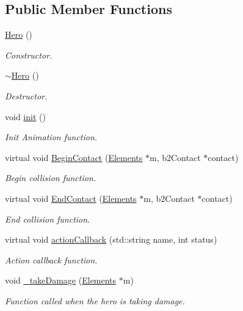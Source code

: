 \subsection*{Public Member Functions}
\begin{DoxyCompactItemize}
\item 
\hyperlink{class_hero_ab5920677a4b5cb59d6f513922d037dca}{Hero} ()
\begin{DoxyCompactList}\small\item\em Constructor. \end{DoxyCompactList}\item 
\hyperlink{class_hero_a5aeef41ede5a80dc29c5acd7b553c4da}{$\sim$\+Hero} ()
\begin{DoxyCompactList}\small\item\em Destructor. \end{DoxyCompactList}\item 
void \hyperlink{class_hero_ae67cc4b7770083755895b78664d0ea34}{init} ()
\begin{DoxyCompactList}\small\item\em Init Animation function. \end{DoxyCompactList}\item 
virtual void \hyperlink{class_hero_ac23c090d8f5e2768b4175580a0d53d1b}{Begin\+Contact} (\hyperlink{class_elements}{Elements} $\ast$m, b2\+Contact $\ast$contact)
\begin{DoxyCompactList}\small\item\em Begin collision function. \end{DoxyCompactList}\item 
virtual void \hyperlink{class_hero_a9fee92d1b0df478f95bc10ba84015d2a}{End\+Contact} (\hyperlink{class_elements}{Elements} $\ast$m, b2\+Contact $\ast$contact)
\begin{DoxyCompactList}\small\item\em End collision function. \end{DoxyCompactList}\item 
virtual void \hyperlink{class_hero_aa41ef53abd25057ceb431811ccf80ad5}{action\+Callback} (std\+::string name, int status)
\begin{DoxyCompactList}\small\item\em Action callback function. \end{DoxyCompactList}\item 
void \hyperlink{class_hero_a6eee44b6b391f0bff589f6869c21a090}{\+\_\+take\+Damage} (\hyperlink{class_elements}{Elements} $\ast$m)
\begin{DoxyCompactList}\small\item\em Function called when the hero is taking damage. \end{DoxyCompactList}\end{DoxyCompactItemize}
